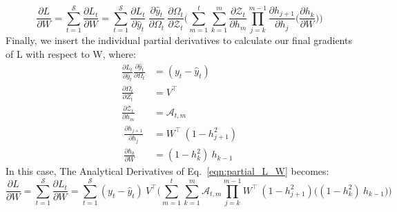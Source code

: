 \documentclass{article}
\begin{document}
\begin{equation}
\frac{\partial L}{ \partial{W}} = \sum_{t=1}^{\mathcal{S}} \frac{\partial L_t}{ \partial{W}} =
\sum_{t=1}^{\mathcal{S}}
\frac{\partial L_t}{\partial \hat{y}_t}~\frac{\partial \hat{y}_t}{\partial \Omega_t}~\frac{\partial \Omega_t}{ \partial \mathcal{Z}_t} \biggl( 
\sum_{m=1}^{t}
\sum_{k=1}^{m} \frac{\partial \mathcal{Z}_t}{ \partial h_m} 
\prod_{j=k}^{m-1} \frac{\partial h_{j+1}}{ \partial h_j} 
\biggl( \frac{\partial h_k}{ \partial W} \biggl) \biggl)
\label{eqn:partial_L_W}
\end{equation}
Finally, we insert the individual partial derivatives to calculate our final gradients of L with respect to W, where:
\begin{align*}
        \frac{\partial L_t}{\partial \hat{y}_t}\frac{\partial \hat{y}_t}{\partial \Omega_t} &= (y_t - \hat{y}_t)\\
        \frac{\partial \Omega_t}{\partial Z_t}
        &= V^\top\\
        \frac{\partial \mathcal{Z}_t}{ \partial h_m}&= \mathcal{A}_{t,m} \\
        ~\frac{\partial h_{j+1}}{\partial h_{j}}
        &= W^\top ~ (1 - h_{j+1}^2) \\
        ~\frac{\partial h_k}{\partial W}&= (1-h_k^2)~ h_{k-1}
\end{align*}
In this case, The Analytical Derivatives of Eq.~\eqref{eqn:partial_L_W} becomes:
\begin{equation}
	\frac{\partial L}{ \partial{W}} = \sum_{t=1}^{\mathcal{S}} \frac{\partial L_t}{ \partial{W}} =
\sum_{t=1}^{\mathcal{S}}
(y_t - \hat{y}_t)~V^\top \biggl( 
\sum_{m=1}^{t}
\sum_{k=1}^{m} \mathcal{A}_{t,m} 
\prod_{j=k}^{m-1} W^\top ~ (1 - h_{j+1}^2)
\biggl( (1-h_k^2)~ h_{k-1} \biggl) \biggl)
 \label{eqn:partial_L_aW}
\end{equation}
\end{document}
